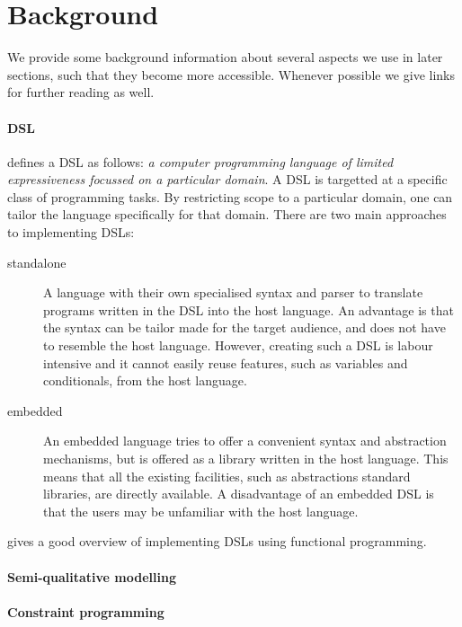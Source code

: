 \section{Background}
\label{sec:background}

We provide some background information about several aspects we use in later
sections, such that they become more accessible. Whenever possible we give links 
for further reading as well.


\paragraph{\acl{DSL}} \citet{fowler} defines a \ac{DSL} as follows:
\emph{a computer programming language of limited expressiveness focussed on a
particular domain}. A \ac{DSL} is targetted at a specific class of programming
tasks. By restricting scope to a particular domain, one can tailor the language
specifically for that domain. There are two main approaches to implementing
\acp{DSL}: 
\begin{description}
  \item[standalone] A language with their own specialised syntax and parser to
  translate programs written in the \ac{DSL} into the host language. An
  advantage is that the syntax can be tailor made for the target audience, and
  does not have to resemble the host language. However, creating such a \ac{DSL}
  is labour intensive and it cannot easily reuse features, such as variables and
  conditionals, from the host language. 
 \item[embedded] An embedded language tries to offer a convenient syntax and
   abstraction mechanisms, but is offered as a library written in the host 
   language. This means that all the existing facilities, such as abstractions 
   standard libraries, are directly available. A disadvantage of an embedded 
   \ac{DSL} is that the users may be unfamiliar with the host language. 
\end{description}
\citet{Gibbons2015} gives a good overview of implementing \acp{DSL} using
functional programming.

\paragraph{Semi-qualitative modelling} 

\paragraph{Constraint programming} 


